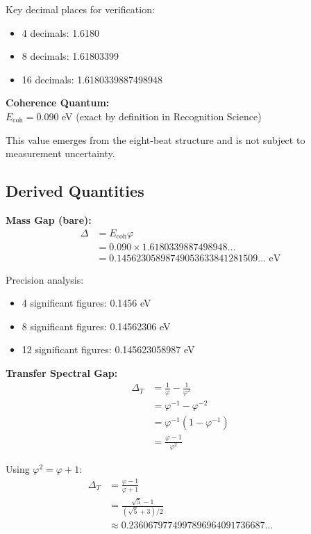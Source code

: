 \documentclass[11pt]{article}
\numberwithin{equation}{section}
\theoremstyle{remark}
\newcommand{\Ecoh}{E_{\text{coh}}}
\newcommand{\massGap}{\Delta}
\newcommand{\transferGap}{\Delta_T}
\begin{document}
Key decimal places for verification:
\begin{itemize}
\item 4 decimals: 1.6180
\item 8 decimals: 1.61803399
\item 16 decimals: 1.6180339887498948
\end{itemize}

\textbf{Coherence Quantum:}\\
$\Ecoh = 0.090$ eV (exact by definition in Recognition Science)

This value emerges from the eight-beat structure and is not subject to measurement uncertainty.

\subsection{Derived Quantities}

\textbf{Mass Gap (bare):}
\begin{align}
\massGap &= \Ecoh \varphi\\
&= 0.090 \times 1.6180339887498948\ldots\\
&= 0.14562305898749053633841281509\ldots \text{ eV}
\end{align}

Precision analysis:
\begin{itemize}
\item 4 significant figures: 0.1456 eV
\item 8 significant figures: 0.14562306 eV
\item 12 significant figures: 0.145623058987 eV
\end{itemize}

\textbf{Transfer Spectral Gap:}
\begin{align}
\transferGap &= \frac{1}{\varphi} - \frac{1}{\varphi^2}\\
&= \varphi^{-1} - \varphi^{-2}\\
&= \varphi^{-1}(1 - \varphi^{-1})\\
&= \frac{\varphi - 1}{\varphi^2}
\end{align}

Using $\varphi^2 = \varphi + 1$:
\begin{align}
\transferGap &= \frac{\varphi - 1}{\varphi + 1}\\
&= \frac{\sqrt{5} - 1}{(\sqrt{5} + 3) / 2}\\
&\approx 0.2360679774997896964091736687\ldots
\end{align}
\end{document}
